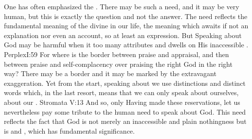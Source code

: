 One has often emphasized the . There may be
such a need, and it may be very human, but this is exactly the question and not
the answer.  The need reflects the fundamental meaning of the divine in our
life, the meaning which awaits if not an explanation nor even an account, so at
least an expression. But  Speaking about God
may be harmful when it  too many attributes and dwells on His
inaccessible .  \citet{We cannot approve of what those foolish
  persons do who are extravagant in praise, fluent and prolix in the prayers
  they compose, and in the hymns they make in the desire to approach the
  Creator.}{Perplex}{I:59} For where is the border between praise and appraisal,
and then between praise and self-complacency over praising the right God in the
right way? There may be a border and it may be marked by the extravagant
exaggeration. Yet from the start, speaking about  we use
distinctions and distinct words which, in the last resort, means that we can
only speak about ourselves, about our . \citet{Everything
  which falls under a name is originated, whether [we] will or not.}{Stromata}{
  V:13} And so, only 
Having made these reservations, let us nevertheless pay some tribute to the human
need to speak about God. This need reflects the fact that God is not
merely an inaccessible and plain nothingness but is  and
, which  has fundamental 
significance. 

